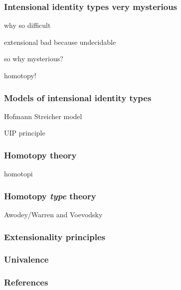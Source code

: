 \documentclass[handout]{beamer} %
\begin{document}
\begin{frame}
  \frametitle{Intensional identity types very mysterious}
  
  why so difficult

  extensional bad because undecidable

  so why mysterious?
  
  homotopy!
\end{frame}

\begin{frame}
  \frametitle{Models of intensional identity types}
  
  Hofmann Streicher model

  UIP principle
\end{frame}

\begin{frame}
  \frametitle{Homotopy theory}

  homotopi
\end{frame}

\begin{frame}
  \frametitle{Homotopy \emph{type} theory}
  
  Awodey/Warren and Voevodsky
\end{frame}

\begin{frame}
  \frametitle{Extensionality principles}
  
\end{frame}

\begin{frame}
  \frametitle{Univalence}
  
\end{frame}

\begin{frame}
  \frametitle{References}
  
  
  \nocite{hott_2013}
  \nocite{awodey_2012}
  \nocite{shulman_2017}
\end{frame}
\end{document}

